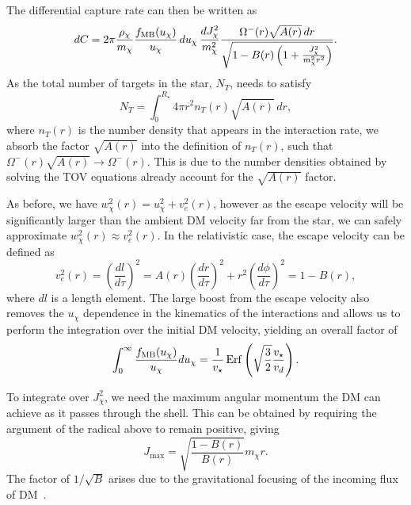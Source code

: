 The differential capture rate can then be written as 
\begin{equation}
    dC =  2\pi  \frac{\rho_\chi}{m_\chi}\frac{f_{\rm MB}(u_\chi)}{u_\chi}\,du_\chi\,\frac{dJ^2_\chi}{m_\chi^2} \frac{\Omega^-(r)\sqrt{A(r)} \,dr}{\sqrt{1 - B(r)\left( 1 + \frac{J_\chi^2}{m_\chi^2 r^2} \right)}}.
\end{equation}
As the total number of targets in the star, $N_T$, needs to satisfy
\begin{equation}
    N_T = \int_0^{R_\star} 4\pi r^2 n_T(r)\sqrt{A(r)}\,dr,
\end{equation}
where $n_T(r)$ is the number density that appears in the interaction rate, we absorb the factor $\sqrt{A(r)}$ into the definition of $n_T(r)$, such that $\Omega^-(r)\sqrt{A(r)}\rightarrow \Omega^-(r)$. This is due to the number densities obtained by solving the TOV equations already account for the $\sqrt{A(r)}$ factor. 

As before, we have $w_\chi^2(r) = u_\chi^2 + v_e^2(r)$, however as the escape velocity will be significantly larger than the ambient DM velocity far from the star, we can safely approximate $w_\chi^2(r)\approx v_e^2(r)$. 
In the relativistic case, the escape velocity can be defined as
\begin{equation}
    v_e^2(r) = \left(\frac{dl}{d\tau}\right)^2 = A(r) \left(\frac{dr}{d\tau}\right)^2 + r^2 \left(\frac{d\phi}{d\tau}\right)^2 = 1 - B(r),
    \label{ch3:eq:vesceq}
\end{equation}
where $dl$ is a length element. 
The large boost from the escape velocity also removes the $u_\chi$ dependence in the kinematics of the interactions and allows us to perform the integration over the initial DM velocity, yielding an overall factor of
\begin{equation}
    \int_0^\infty \frac{f_{\rm MB}(u_\chi)}{u_\chi} du_\chi = \frac{1}{v_\star}{\rm \,Erf}\left(\sqrt{\frac{3}{2}}\frac{v_\star}{v_d}\right).
\end{equation}

To integrate over $J^2_\chi$, we need the maximum angular momentum the DM can achieve as it passes through the shell. This can be obtained by requiring the argument of the radical above to remain positive, giving
\begin{equation}
    J_\mathrm{max} = \sqrt{\frac{1 - B(r)}{B(r)}} m_\chi r.
\end{equation}
The factor of $1/\sqrt{B}$ arises due to the gravitational focusing of the incoming flux of DM~\cite{Kouvaris:2007ay_WIMPAnnihilationCooling}.

